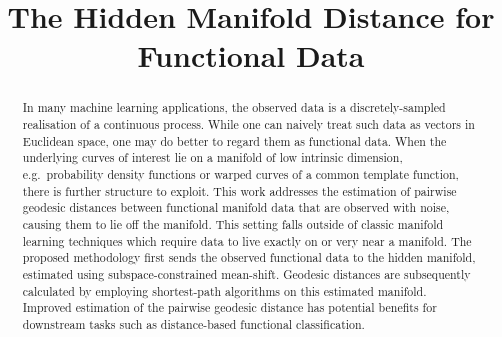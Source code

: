 \documentclass[letterpaper]{article} %
\title{The Hidden Manifold Distance for Functional Data}
\begin{document}
\maketitle

\begin{abstract}
In many machine learning applications, the observed data is a
discretely-sampled realisation of a continuous process. While one can
naively treat such data as vectors in Euclidean space, one may do better
to regard them as functional data.  
When the underlying curves of interest lie on a manifold of low intrinsic
dimension, e.g.~probability density
functions or warped curves of a common template function, there is further structure to exploit. 
This work addresses the estimation of pairwise geodesic
distances between functional manifold data that are observed with noise,
causing them to lie off the manifold. This setting falls outside of
classic manifold learning techniques which require data to live exactly
on or very near a manifold. The proposed methodology first sends the
observed functional data to the hidden manifold, estimated using
subspace-constrained mean-shift. Geodesic distances are subsequently
calculated by employing shortest-path algorithms on this estimated
manifold. Improved estimation of the pairwise geodesic distance has
potential benefits for downstream tasks such as distance-based functional classification.
\end{abstract}







% 
% 

\newpage



\end{document}
